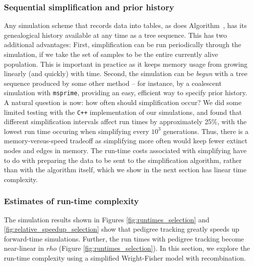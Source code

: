 \documentclass{article}
\newcommand{\cpp}{\texttt{C++}}
\newcommand{\msprime}{\texttt{msprime}}
\newcommand{\krt}[1]{{\em \color{green} #1}}
\begin{document}
\subsubsection*{Sequential simplification and prior history}

Any simulation scheme that records data into tables,
as does Algorithm~,
has its genealogical history available at any time as a tree sequence.
This has two additional advantages:
First, simplification can be run periodically through the simulation,
if we take the set of samples to be the entire currently alive population.
This is important in practice as it keeps memory usage from growing linearly (and quickly) with time.
Second, the simulation can
be \emph{begun} with a tree sequence produced by some other method -- for
instance, by a coalescent simulation with \msprime,
providing an easy, efficient way to specify prior history.
A natural question is now: how often should simplification occur?  We did some limited testing with the \cpp{}
implementation of our simulations, and found that different simplification intervals affect run times by approximately
25\%, with the lowest run time occuring when simplifying every $10^3$ generations.  Thus, there is a memory-versus-speed
tradeoff as simplifying more often would keep fewer extinct nodes and edges in memory.  The run-time costs associated
with simplifying have to do with preparing the data to be sent to the simplification algorithm, rather than with the
algorithm itself, which we show in the next section has linear time complexity.

% 



\subsubsection*{Estimates of run-time complexity}

The simulation results shown in Figures \ref{fig:runtimes_selection} and \ref{fig:relative_speedup_selection} show that
pedigree tracking greatly speeds up forward-time simulations.  Further, the run times with pedigree tracking become
near-linear in $rho$ (Figure \ref{fig:runtimes_selection}).  In this section, we explore the run-time complexity using a
simplified Wright-Fisher model with recombination.
\end{document}
